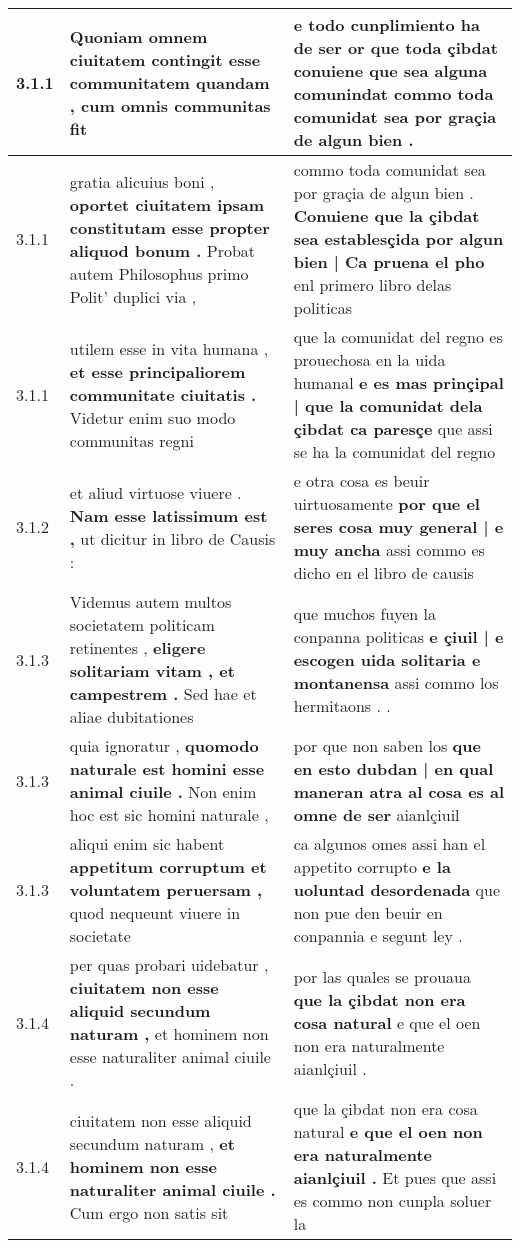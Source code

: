 \begin{tabular}{|p{1cm}|p{6.5cm}|p{6.5cm}|}
3.1.1 & Quoniam omnem ciuitatem contingit \textbf{ esse communitatem quandam , } cum omnis communitas fit & e todo cunplimiento ha de ser \textbf{ or que toda çibdat conuiene que sea alguna comunindat } commo toda comunidat sea por graçia de algun bien . \\\hline
3.1.1 & gratia alicuius boni , \textbf{ oportet ciuitatem ipsam constitutam esse propter aliquod bonum . } Probat autem Philosophus primo Polit’ duplici via , & commo toda comunidat sea por graçia de algun bien . \textbf{ Conuiene que la çibdat sea establesçida por algun bien | Ca pruena el pho } enl primero libro delas politicas \\\hline
3.1.1 & utilem esse in vita humana , \textbf{ et esse principaliorem communitate ciuitatis . } Videtur enim suo modo communitas regni & que la comunidat del regno es prouechosa en la uida humanal \textbf{ e es mas prinçipal | que la comunidat dela çibdat ca paresçe } que assi se ha la comunidat del regno \\\hline
3.1.2 & et aliud virtuose viuere . \textbf{ Nam esse latissimum est , } ut dicitur in libro de Causis : & e otra cosa es beuir uirtuosamente \textbf{ por que el seres cosa muy general | e muy ancha } assi commo es dicho en el libro de causis \\\hline
3.1.3 & Videmus autem multos societatem politicam retinentes , \textbf{ eligere solitariam vitam , et campestrem . } Sed hae et aliae dubitationes & que muchos fuyen la conpanna politicas \textbf{ e çiuil | e escogen uida solitaria e montanensa } assi commo los hermitaons . . \\\hline
3.1.3 & quia ignoratur , \textbf{ quomodo naturale est homini esse animal ciuile . } Non enim hoc est sic homini naturale , & por que non saben los \textbf{ que en esto dubdan | en qual maneran atra al cosa es al omne de ser } aianlçiuil \\\hline
3.1.3 & aliqui enim sic habent \textbf{ appetitum corruptum et voluntatem peruersam , } quod nequeunt viuere in societate & ca algunos omes assi han el appetito corrupto \textbf{ e la uoluntad desordenada } que non pue den beuir en conpannia e segunt ley . \\\hline
3.1.4 & per quas probari uidebatur , \textbf{ ciuitatem non esse aliquid secundum naturam , } et hominem non esse naturaliter animal ciuile . & por las quales se prouaua \textbf{ que la çibdat non era cosa natural } e que el oen non era naturalmente aianlçiuil . \\\hline
3.1.4 & ciuitatem non esse aliquid secundum naturam , \textbf{ et hominem non esse naturaliter animal ciuile . } Cum ergo non satis sit & que la çibdat non era cosa natural \textbf{ e que el oen non era naturalmente aianlçiuil . } Et pues que assi es commo non cunpla soluer la \\\hline

\end{tabular}
